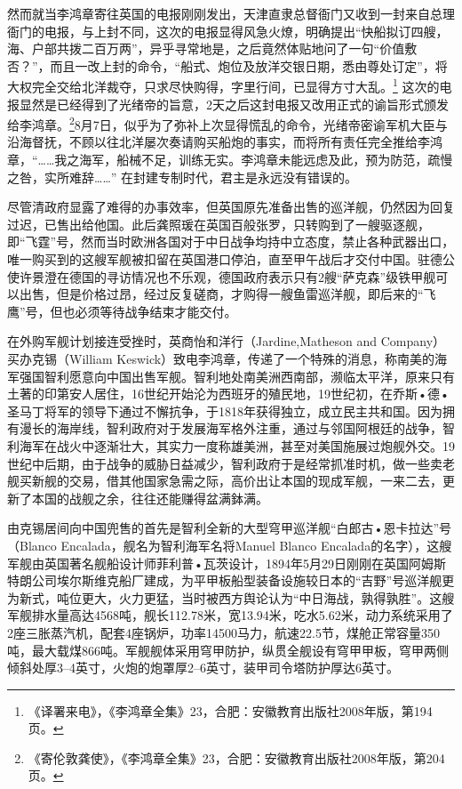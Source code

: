 \documentclass[12pt,UTF8]{ctexbook}
\begin{document}
然而就当李鸿章寄往英国的电报刚刚发出，天津直隶总督衙门又收到一封来自总理衙门的电报，与上封不同，这次的电报显得风急火燎，明确提出“快船拟订四艘，海、户部共拨二百万两”，异乎寻常地是，之后竟然体贴地问了一句“价值敷否？”，而且一改上封的命令，“船式、炮位及放洋交银日期，悉由尊处订定”，将大权完全交给北洋裁夺，只求尽快购得，字里行间，已显得方寸大乱。\footnote{《译署来电》，《李鸿章全集》23，合肥：安徽教育出版社2008年版，第194页。} 这次的电报显然是已经得到了光绪帝的旨意，2天之后这封电报又改用正式的谕旨形式颁发给李鸿章。\footnote{《寄伦敦龚使》，《李鸿章全集》23，合肥：安徽教育出版社2008年版，第204页。}8月7日，似乎为了弥补上次显得慌乱的命令，光绪帝密谕军机大臣与沿海督抚，不顾以往北洋屡次奏请购买船炮的事实，而将所有责任完全推给李鸿章，“……我之海军，船械不足，训练无实。李鸿章未能远虑及此，预为防范，疏慢之咎，实所难辞……” 在封建专制时代，君主是永远没有错误的。

尽管清政府显露了难得的办事效率，但英国原先准备出售的巡洋舰，仍然因为回复过迟，已售出给他国。此后龚照瑗在英国百般张罗，只转购到了一艘驱逐舰，即“飞霆”号，然而当时欧洲各国对于中日战争均持中立态度，禁止各种武器出口，唯一购买到的这艘军舰被扣留在英国港口停泊，直至甲午战后才交付中国。驻德公使许景澄在德国的寻访情况也不乐观，德国政府表示只有2艘“萨克森”级铁甲舰可以出售，但是价格过昂，经过反复磋商，才购得一艘鱼雷巡洋舰，即后来的“飞鹰”号，但也必须等待战争结束才能交付。

在外购军舰计划接连受挫时，英商怡和洋行（Jardine,Matheson and Company）买办克锡（William Keswick）致电李鸿章，传递了一个特殊的消息，称南美的海军强国智利愿意向中国出售军舰。智利地处南美洲西南部，濒临太平洋，原来只有土著的印第安人居住，16世纪开始沦为西班牙的殖民地，19世纪初，在乔斯•德•圣马丁将军的领导下通过不懈抗争，于1818年获得独立，成立民主共和国。因为拥有漫长的海岸线，智利政府对于发展海军格外注重，通过与邻国阿根廷的战争，智利海军在战火中逐渐壮大，其实力一度称雄美洲，甚至对美国施展过炮舰外交。19世纪中后期，由于战争的威胁日益减少，智利政府于是经常抓准时机，做一些卖老舰买新舰的交易，借其他国家急需之际，高价出让本国的现成军舰，一来二去，更新了本国的战舰之余，往往还能赚得盆满鉢满。

由克锡居间向中国兜售的首先是智利全新的大型穹甲巡洋舰“白郎古•恩卡拉达”号（Blanco Encalada，舰名为智利海军名将Manuel Blanco Encalada的名字），这艘军舰由英国著名舰船设计师菲利普•瓦茨设计，1894年5月29日刚刚在英国阿姆斯特朗公司埃尔斯维克船厂建成，为平甲板船型装备设施较日本的“吉野”号巡洋舰更为新式，吨位更大，火力更猛，当时被西方舆论认为“中日海战，孰得孰胜”。这艘军舰排水量高达4568吨，舰长112.78米，宽13.94米，吃水5.62米，动力系统采用了2座三胀蒸汽机，配套4座锅炉，功率14500马力，航速22.5节，煤舱正常容量350吨，最大载煤866吨。军舰舰体采用穹甲防护，纵贯全舰设有穹甲甲板，穹甲两侧倾斜处厚3--4英寸，火炮的炮罩厚2--6英寸，装甲司令塔防护厚达6英寸。
\end{document}
